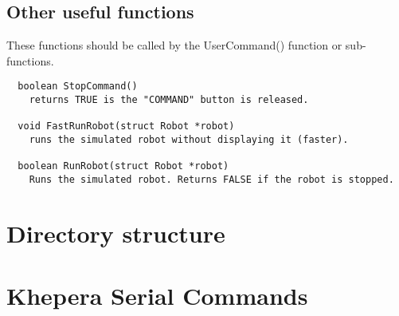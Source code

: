 \documentclass[a4paper,twoside]{article}
\begin{document}
\subsection{Other useful functions}

These functions should be called by the UserCommand() function or
sub-functions.

\begin{verbatim}
  boolean StopCommand()
    returns TRUE is the "COMMAND" button is released.

  void FastRunRobot(struct Robot *robot)
    runs the simulated robot without displaying it (faster).

  boolean RunRobot(struct Robot *robot)
    Runs the simulated robot. Returns FALSE if the robot is stopped.
\end{verbatim}

\newpage

\section{Directory structure \label{dir-structure}}

\newpage

\section{Khepera Serial Commands \label{khep_serial}}
\end{document}
